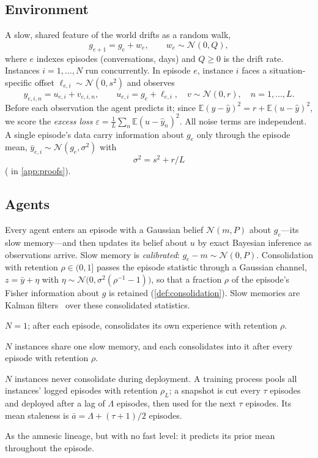 \documentclass[11pt]{article}
\theoremstyle{plain}
\theoremstyle{definition}
\theoremstyle{remark}
\newcommand{\E}{\mathbb{E}}
\newcommand{\abar}{\bar a}
\newcommand{\eps}{\varepsilon}
\begin{document}
\subsection{Environment}
A slow, shared feature of the world drifts as a random walk,
\begin{equation}
g_{e+1}=g_e+w_e,\qquad w_e\sim\mathcal{N}(0,Q),
\end{equation}
where $e$ indexes episodes (conversations, days) and $Q\ge0$ is the drift rate. Instances $i=1,\dots,N$ run concurrently. In episode $e$, instance $i$ faces a situation-specific offset $\ell_{e,i}\sim\mathcal{N}(0,s^2)$ and observes
\begin{equation}
y_{e,i,n}=u_{e,i}+v_{e,i,n},\qquad u_{e,i}=g_e+\ell_{e,i},\quad v\sim\mathcal{N}(0,r),\quad n=1,\dots,L.
\end{equation}
Before each observation the agent predicts it; since $\E(y-\hat y)^2=r+\E(u-\hat y)^2$, we score the \emph{excess loss} $\eps=\frac1L\sum_n\E(u-\hat y_n)^2$. All noise terms are independent. A single episode's data carry information about $g_e$ only through the episode mean, $\bar y_{e,i}\sim\mathcal{N}(g_e,\sigma^2)$ with
\begin{equation}
\sigma^2=s^2+r/L
\end{equation}
( in \cref{app:proofs}).

\subsection{Agents}
Every agent enters an episode with a Gaussian belief $\mathcal{N}(m,P)$ about $g_e$---its slow memory---and then updates its belief about $u$ by exact Bayesian inference as observations arrive. Slow memory is \emph{calibrated}: $g_e-m\sim\mathcal{N}(0,P)$. Consolidation with retention $\rho\in(0,1]$ passes the episode statistic through a Gaussian channel, $z=\bar y+\eta$ with $\eta\sim\mathcal{N}\big(0,\sigma^2(\rho^{-1}-1)\big)$, so that a fraction $\rho$ of the episode's Fisher information about $g$ is retained (\cref{def:consolidation}). Slow memories are Kalman filters~\citep{kalman1960new} over these consolidated statistics.

\begin{description}[leftmargin=0.5cm,itemsep=2pt,font=\normalfont\itshape]
\item[Consolidating individual (human-like).] $N=1$; after each episode, consolidates its own experience with retention $\rho$.
\item[Hive learner.] $N$ instances share one slow memory, and each consolidates into it after every episode with retention $\rho$.
\item[Amnesic lineage (LLM-like).] $N$ instances never consolidate during deployment. A training process pools all instances' logged episodes with retention $\rho_L$; a snapshot is cut every $\tau$ episodes and deployed after a lag of $\Lambda$ episodes, then used for the next $\tau$ episodes. Its mean staleness is $\abar=\Lambda+(\tau+1)/2$ episodes.
\item[Darwinian lineage.] As the amnesic lineage, but with no fast level: it predicts its prior mean throughout the episode.
\end{description}
\end{document}
